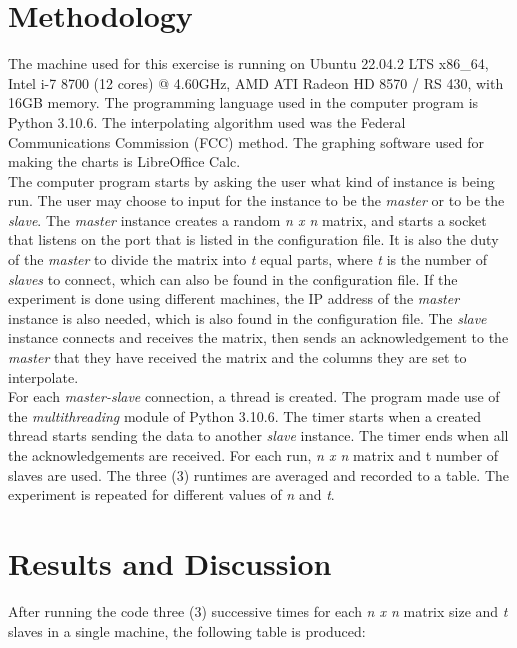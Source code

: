 \documentclass{article}
\begin{document}
\section*{Methodology}
\hspace{\parindent} The machine used for this exercise is running on Ubuntu 22.04.2 LTS x86\_64, Intel i-7 8700 (12 cores) @ 4.60GHz, AMD ATI Radeon HD 8570 / RS 430, with 16GB memory. The programming language used in the computer program is Python 3.10.6. The interpolating algorithm used was the Federal Communications Commission (FCC) method. The graphing software used for making the charts is LibreOffice Calc. \\
\indent The computer program starts by asking the user what kind of instance is being run. The user may choose to input for the instance to be the \emph{master} or to be the \emph{slave}. The \emph{master} instance creates a random \emph{n x n} matrix, and starts a socket that listens on the port that is listed in the configuration file. It is also the duty of the \emph{master} to divide the matrix into \emph{t} equal parts, where \emph{t} is the number of \emph{slaves} to connect, which can also be found in the configuration file. If the experiment is done using different machines, the IP address of the \emph{master} instance is also needed, which is also found in the configuration file. The \emph{slave} instance connects and receives the matrix, then sends an acknowledgement to the \emph{master} that they have received the matrix and the columns they are set to interpolate. \\
\indent For each \emph{master-slave} connection, a thread is created. The program made use of the \emph{multithreading} module of Python 3.10.6. The timer starts when a created thread starts sending the data to another \emph{slave} instance. The timer ends when all the acknowledgements are received. For each run, \emph{n x n} matrix and t number of slaves are used. The three (3) runtimes are averaged and recorded to a table. The experiment is repeated for different values of \emph{n} and \emph{t}.\\


\section*{Results and Discussion}
\hspace{\parindent} After running the code three (3) successive times for each \emph{n x n} matrix size and \emph{t} slaves in a single machine, the following table is produced:
\end{document}
